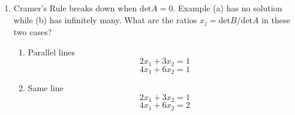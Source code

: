 \begin{enumerate}
    \item Cramer's Rule breaks down when $\text{det}A=0$. Example (a) has
        no solution while (b) has infinitely many. What are the ratios
        $x_{j} = \text{det}B/\text{det}A$ in these two cases?
        \begin{enumerate}[label=\alph*.]
            \item Parallel lines 
                \begin{equation}
                    2x_{1} + 3x_{2} = 1
                \end{equation}
                \begin{equation}
                    4x_{1} + 6x_{2} = 1
                \end{equation}
                
            \item Same line
                \begin{equation}
                    2x_{1} + 3x_{2} = 1
                \end{equation}
                \begin{equation}
                    4x_{1} + 6x_{2} =2 
                \end{equation}
        \end{enumerate}


\end{enumerate}
